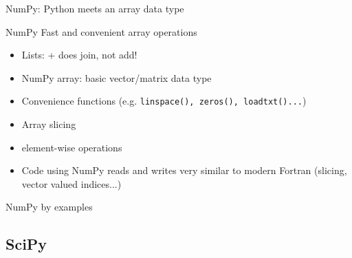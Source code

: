 \begin{frame}{NumPy: Python meets an array data type}

\begin{exbox}{NumPy}
Fast and convenient array operations
\end{exbox}

\begin{itemize}
	\item Lists: + does join, not add!
	\item NumPy array: basic vector/matrix data type
	\item Convenience functions (e.g. {\texttt{linspace(), zeros(), loadtxt()...}})
	\item Array slicing
	\item element-wise operations
	\item Code using NumPy reads and writes very similar to modern Fortran
	(slicing, vector valued indices...)
\end{itemize}

\end{frame}

\begin{frame}[fragile]{NumPy by examples}



\end{frame}

\subsection{SciPy}

